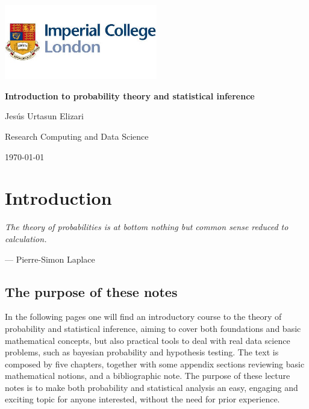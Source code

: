 \documentclass{book}
\begin{document}

\frontmatter

\begin{titlepage}
    \centering
    \includegraphics[width=0.5\textwidth]{figures/icl_logo.jpeg} 
    \vfill
    {\Huge\bfseries Introduction to probability theory and statistical inference\par}
    \vspace{1cm}
    {\Large Jes\'us Urtasun Elizari\par}
    \vspace{1cm}
     {\Large Research Computing and Data Science\par}
    \vspace{1cm}
    {\large\today\par}
    \vspace*{\fill}
\end{titlepage}

\tableofcontents

\clearpage
\printindex

\mainmatter



\chapter*{Introduction}

\epigraph{\textit{The theory of probabilities is at bottom nothing but common sense reduced to calculation.}}{— Pierre-Simon Laplace}

\section*{The purpose of these notes}

In the following pages one will find an introductory course to the theory of probability and statistical inference, aiming to cover both foundations and basic mathematical concepts, but also practical tools to deal with real data science problems, such as bayesian probability and hypothesis testing. The text is composed by five chapters, together with some appendix sections reviewing basic mathematical notions, and a bibliographic note. The purpose of these lecture notes is to make both probability and statistical analysis an easy, engaging and exciting topic for anyone interested, without the need for prior experience.
\end{document}
